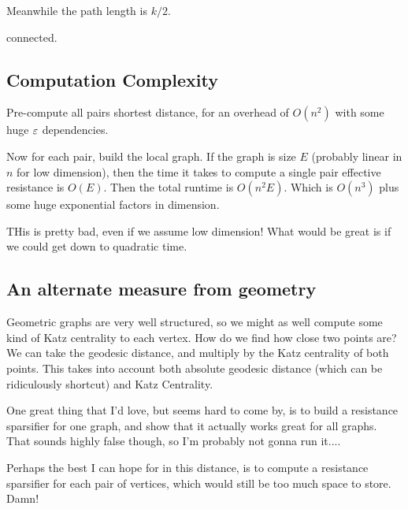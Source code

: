 Meanwhile the path length is $k/2$.



connected.
\subsection{Computation Complexity}
Pre-compute all pairs shortest distance, for an overhead of
$O(n^2)$ with some huge $\varepsilon$ dependencies.

Now for each pair, build the local graph. If the graph is size $E$
(probably linear in $n$ for low dimension), then the time it
takes to compute a single pair effective resistance is $O(E)$.
Then the total runtime is $O(n^2 E)$. Which is $O(n^3)$ plus some
huge exponential factors in dimension.

THis is pretty bad, even if we assume low dimension! What would
be great is if we could get down to quadratic time. 

\subsection{An alternate measure from geometry}
Geometric graphs are very well structured, so we might as well
compute some kind of Katz centrality to each vertex. How do we
find how close two points are? We can take the geodesic distance,
and multiply by the Katz centrality of both points. This takes
into account both absolute geodesic distance (which can be
    ridiculously shortcut) and Katz Centrality.



One great thing that I'd love, but seems hard to come by, is to
build a resistance sparsifier for one graph, and show that it
actually works great for all graphs. That sounds highly false
though, so I'm probably not gonna run it....


Perhaps the best I can hope for in this distance, is to compute a
resistance sparsifier for each pair of vertices, which would
still be too much space to store. Damn!

% 

